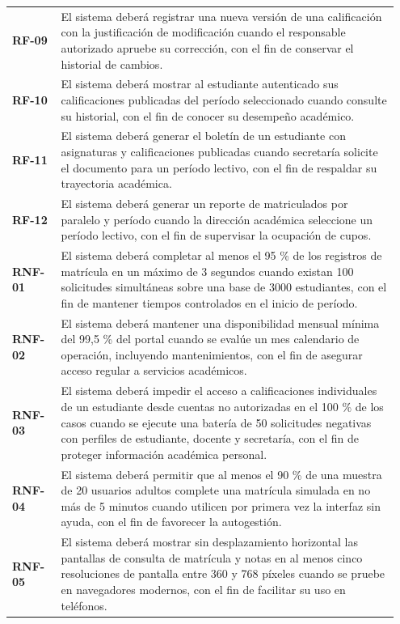 \begin{longtable}{@{}p{0.12\linewidth}p{0.83\linewidth}@{}}
\textbf{RF-09} & El sistema deberá registrar una nueva versión de una calificación con la justificación de modificación cuando el responsable autorizado apruebe su corrección, con el fin de conservar el historial de cambios. \\
\textbf{RF-10} & El sistema deberá mostrar al estudiante autenticado sus calificaciones publicadas del período seleccionado cuando consulte su historial, con el fin de conocer su desempeño académico. \\
\textbf{RF-11} & El sistema deberá generar el boletín de un estudiante con asignaturas y calificaciones publicadas cuando secretaría solicite el documento para un período lectivo, con el fin de respaldar su trayectoria académica. \\
\textbf{RF-12} & El sistema deberá generar un reporte de matriculados por paralelo y período cuando la dirección académica seleccione un período lectivo, con el fin de supervisar la ocupación de cupos. \\
\textbf{RNF-01} & El sistema deberá completar al menos el 95 \% de los registros de matrícula en un máximo de 3 segundos cuando existan 100 solicitudes simultáneas sobre una base de 3000 estudiantes, con el fin de mantener tiempos controlados en el inicio de período. \\
\textbf{RNF-02} & El sistema deberá mantener una disponibilidad mensual mínima del 99,5 \% del portal cuando se evalúe un mes calendario de operación, incluyendo mantenimientos, con el fin de asegurar acceso regular a servicios académicos. \\
\textbf{RNF-03} & El sistema deberá impedir el acceso a calificaciones individuales de un estudiante desde cuentas no autorizadas en el 100 \% de los casos cuando se ejecute una batería de 50 solicitudes negativas con perfiles de estudiante, docente y secretaría, con el fin de proteger información académica personal. \\
\textbf{RNF-04} & El sistema deberá permitir que al menos el 90 \% de una muestra de 20 usuarios adultos complete una matrícula simulada en no más de 5 minutos cuando utilicen por primera vez la interfaz sin ayuda, con el fin de favorecer la autogestión. \\
\textbf{RNF-05} & El sistema deberá mostrar sin desplazamiento horizontal las pantallas de consulta de matrícula y notas en al menos cinco resoluciones de pantalla entre 360 y 768 píxeles cuando se pruebe en navegadores modernos, con el fin de facilitar su uso en teléfonos. \\

\end{longtable}
